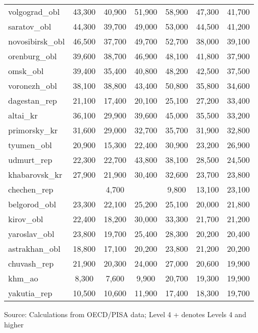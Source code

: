 \documentclass[alpha-refs,fleqn]{wiley-article_p2}
\begin{document}
\begin{table}[h]
\begin{threeparttable}
\begin{tabular}{p{5.5cm}cccccc}
volgograd\_obl	&	43,300	&	40,900	&	51,900	&	58,900	&	47,300	&	41,700	\\
saratov\_obl	&	44,300	&	39,700	&	49,000	&	53,000	&	44,500	&	41,200	\\
novosibirsk\_obl	&	46,500	&	37,700	&	49,700	&	52,700	&	38,000	&	39,100	\\
orenburg\_obl	&	39,600	&	38,700	&	46,900	&	48,100	&	41,800	&	37,900	\\
omsk\_obl	&	39,400	&	35,400	&	40,800	&	48,200	&	42,500	&	37,500	\\
voronezh\_obl	&	38,100	&	38,800	&	43,400	&	50,800	&	35,800	&	34,600	\\
\rowcolor{blue!20}
dagestan\_rep	&	21,100	&	17,400	&	20,100	&	25,100	&	27,200	&	33,400	\\
altai\_kr	&	36,100	&	29,900	&	39,600	&	45,000	&	35,500	&	33,200	\\
primorsky\_kr	&	31,600	&	29,000	&	32,700	&	35,700	&	31,900	&	32,800	\\
\rowcolor{blue!20}
tyumen\_obl	&	20,900	&	15,300	&	22,400	&	30,900	&	23,200	&	26,900	\\
udmurt\_rep	&	22,300	&	22,700	&	43,800	&	38,100	&	28,500	&	24,500	\\
khabarovsk\_kr	&	27,900	&	21,900	&	30,400	&	32,600	&	23,700	&	23,800	\\
chechen\_rep	&		&	4,700	&		&	9,800	&	13,100	&	23,100	\\
belgorod\_obl	&	23,300	&	22,100	&	25,200	&	25,100	&	20,000	&	21,800	\\
kirov\_obl	&	22,400	&	18,200	&	30,000	&	33,300	&	21,700	&	21,200	\\
yaroslav\_obl	&	23,800	&	19,700	&	25,400	&	28,300	&	20,200	&	20,400	\\
astrakhan\_obl	&	18,800	&	17,100	&	20,200	&	23,800	&	21,200	&	20,200	\\
chuvash\_rep	&	21,900	&	20,300	&	24,000	&	27,000	&	20,600	&	19,900	\\
\rowcolor{blue!20}
khm\_ao	&	8,300	&	7,600	&	9,900	&	20,700	&	19,300	&	19,900	\\
\rowcolor{blue!20}
yakutia\_rep	&	10,500	&	10,600	&	11,900	&	17,400	&	18,300	&	19,700	\\
\hline  %
\end{tabular}
\begin{tablenotes}
\item Source: Calculations from OECD/PISA data; Level 4 + denotes Levels 4 and higher
\end{tablenotes}
\end{threeparttable}
\end{table}
\end{document}
